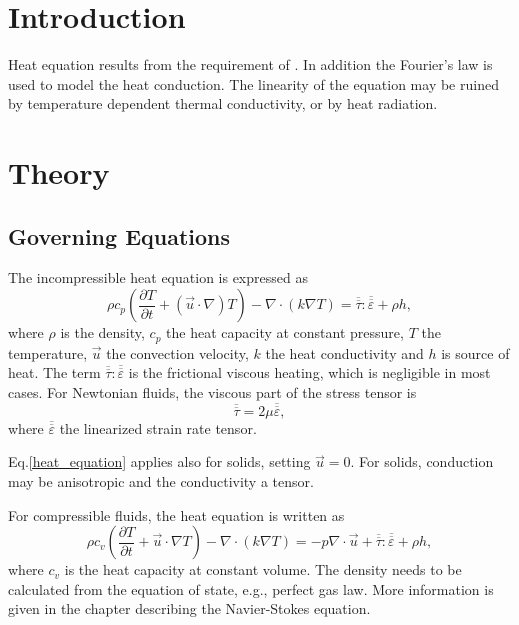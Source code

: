 

\begin{versiona}


\section{Introduction}

Heat equation results from the requirement of .
In addition the Fourier's law is used to model
the heat conduction. The linearity of the equation may be 
ruined by temperature dependent thermal conductivity, or by
heat radiation.


\section{Theory}

\subsection{Governing Equations}
The incompressible heat equation is expressed as
\begin{equation}
\rho  c_p\left( \frac{\partial T}{\partial t}+(\vec u\cdot\nabla) T\right) - 
\nabla\cdot(k\nabla T) =
\overline{\overline\tau}:\overline{\overline \varepsilon} + \rho h,
\label{heat_equation}
\end{equation}
where $\rho$ is the density, $c_p$ the heat capacity at constant pressure, 
$T$ the temperature, $\vec u$ the convection velocity, $k$ the heat 
conductivity and $h$ is source of heat.
The term $\overline{\overline\tau}:\overline{\overline \varepsilon}$ is the
frictional viscous heating, which is negligible in most cases. For Newtonian
fluids, the viscous
part of the stress tensor is
\begin{equation}
\overline{\overline\tau} = 2\mu \overline{\overline\varepsilon},
\end{equation}
where $\overline{\overline \varepsilon}$ the linearized strain rate tensor.

Eq.\ref{heat_equation} applies also for solids, setting $\vec u = 0$. For
solids, conduction may be anisotropic and the conductivity a tensor.

For compressible fluids, the heat equation is written as
\begin{equation}
\rho c_v\left(\frac{\partial T}{\partial t} + \vec{u}\cdot\nabla T\right) -
\nabla\cdot\left(k\nabla T\right) = - p \nabla\cdot\vec{u} 
+ \overline{\overline\tau}:\overline{\overline \varepsilon}
+ \rho h,
\end{equation}
where $c_v$ is the heat capacity at constant volume. The density needs to be
calculated from the equation of state, e.g., perfect gas law. More
information is given in the chapter describing the Navier-Stokes equation.


\end{versiona}
